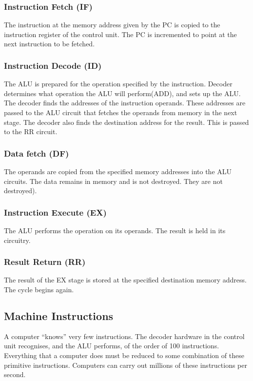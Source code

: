 \subsubsection{Instruction Fetch (IF)}

The instruction at the memory address given by the PC is copied to the instruction register of the control unit.
The PC is incremented to point at the next instruction to be fetched.

\subsubsection{Instruction Decode (ID)}

The ALU is prepared for the operation specified by the instruction.
Decoder determines what operation the ALU will perform(ADD), and sets up the ALU.
The decoder finds the addresses of the instruction operands.
These addresses are passed to the ALU circuit that fetches the operands from memory in the next stage.
The decoder also finds the destination address for the result.
This is passed to the RR circuit.

\subsubsection{Data fetch (DF)}

The operands are copied from the specified memory addresses into the ALU circuits.
The data remains in memory and is not destroyed. They are not destroyed).

\subsubsection{Instruction Execute (EX)}

The ALU performs the operation on its operands.
The result is held in its circuitry.

\subsubsection{Result Return (RR)}

The result of the EX stage is stored at the specified destination memory address.
The cycle begins again.

\subsection{Machine Instructions}

A computer ``knows'' very few instructions.
The decoder hardware in the control unit recognises, and the ALU performs, of the order of \num{100} instructions.
Everything that a computer does must be reduced to some combination of these primitive instructions.
Computers can carry out millions of these instructions per second.

